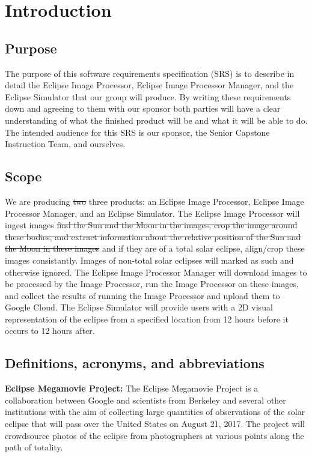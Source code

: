 \documentclass[10pt, onecolumn, draftclsnofoot, letterpaper, compsoc]{IEEEtran}
\begin{document}
\section{Introduction}

\subsection{Purpose}
The purpose of this software requirements specification (SRS) is to describe in
detail the Eclipse Image Processor, Eclipse Image Processor Manager, and the Eclipse
Simulator that our group will
produce. By writing these requirements down and agreeing to them with our
sponsor both parties will have a clear understanding of what the finished
product will be and what it will be able to do. The intended audience for this
SRS is our sponsor, the Senior Capstone Instruction Team, and ourselves.

\subsection{Scope}
We are producing \sout{two} three products: an Eclipse Image Processor, Eclipse
Image Processor Manager, and an Eclipse
Simulator. The Eclipse Image Processor will ingest images \sout{find the Sun and the
Moon in the images, crop the image around these bodies, and extract information
about the relative position of the Sun and the Moon in these images} and if
they are of a total solar eclipse, align/crop these images consistantly. Images of non-total
solar eclipses will marked as such and otherwise ignored. The Eclipse Image Processor Manager
will download images to be processed by the Image Processor, run the Image Processor on these images,
and collect the results of running the Image Processor and upload them to Google Cloud. The Eclipse
Simulator will provide users with a 2D visual representation of the eclipse from a
specified location from 12 hours before it occurs to 12 hours after.

\subsection{Definitions, acronyms, and abbreviations}

	\textbf{Eclipse Megamovie Project:}
	The Eclipse Megamovie Project is a collaboration between Google
	and scientists from Berkeley and several other institutions with the
	aim of collecting large quantities of observations of the solar eclipse
	that will pass over the United States on August 21, 2017. The project
	will crowdsource photos of the eclipse from photographers at various
	points along the path of totality. \\
\end{document}

